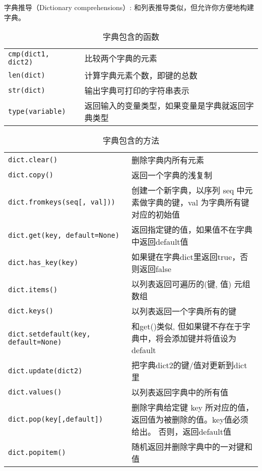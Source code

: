
字典推导（Dictionary comprehensions）: 和列表推导类似，但允许你方便地构建字典。





\begin{table}[htbp]
  \centering
  \caption{字典包含的函数}
  \begin{tabular}{l|l}\hline
    \lstinline|cmp(dict1, dict2)| &比较两个字典的元素\\
    \lstinline|len(dict)        | &计算字典元素个数，即键的总数\\
    \lstinline|str(dict)        | &输出字典可打印的字符串表示\\
    \lstinline|type(variable)   | &返回输入的变量类型，如果变量是字典就返回字典类型\\\hline
  \end{tabular}
\end{table}

\begin{table}[htbp]
  \centering
  \caption{字典包含的方法}
  \begin{tabular}{p{}|p{}}\hline
    \lstinline|dict.clear()                      | &删除字典内所有元素\\
    \lstinline|dict.copy()                       | &返回一个字典的浅复制\\
    \lstinline|dict.fromkeys(seq[, val]))        | &创建一个新字典，以序列 seq 中元素做字典的键，val 为字典所有键对应的初始值\\
    \lstinline|dict.get(key, default=None)       | &返回指定键的值，如果值不在字典中返回default值\\
    \lstinline|dict.has_key(key)                 | &如果键在字典dict里返回true，否则返回false\\
    \lstinline|dict.items()                      | &以列表返回可遍历的(键, 值) 元组数组\\
    \lstinline|dict.keys()                       | &以列表返回一个字典所有的键\\
    \lstinline|dict.setdefault(key, default=None)| &和get()类似, 但如果键不存在于字典中，将会添加键并将值设为default\\
    \lstinline|dict.update(dict2)                | &把字典dict2的键/值对更新到dict里\\
    \lstinline|dict.values()                     | &以列表返回字典中的所有值\\
    \lstinline|dict.pop(key[,default])                | &删除字典给定键 key 所对应的值，返回值为被删除的值。key值必须给出。 否则，返回default值\\
    \lstinline|dict.popitem()                         | &随机返回并删除字典中的一对键和值\\\hline
  \end{tabular}                          
\end{table}



